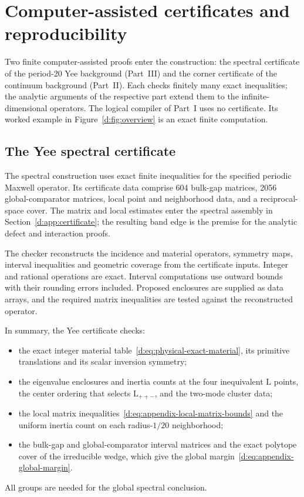 \section{Computer-assisted certificates and reproducibility}\label{d:sec:reproducibility}

Two finite computer-assisted proofs enter the construction: the
spectral certificate of the period-20 Yee background (Part~III) and the
corner certificate of the continuum background (Part~II). Each checks
finitely many exact inequalities; the analytic arguments of the
respective part extend them to the infinite-dimensional operators. The
logical compiler of Part~I uses no certificate. Its worked example in
Figure~\ref{d:fig:overview} is an exact finite computation.

\subsection{The Yee spectral certificate}\label{si:sec:yee-certificate}

The spectral construction uses exact finite inequalities for the specified
periodic Maxwell operator. Its certificate data comprise 604 bulk-gap
matrices, 2056 global-comparator matrices, local point and neighborhood
data, and a reciprocal-space cover. The matrix and local estimates enter
the spectral assembly in Section~\ref{d:app:certificate}; the resulting
band edge is the premise for the analytic defect and interaction proofs.

The checker reconstructs the incidence and material operators, symmetry
maps, interval inequalities and geometric coverage from the certificate
inputs. Integer and rational operations are exact. Interval computations
use outward bounds with their rounding errors included. Proposed
enclosures are supplied as data arrays, and the required matrix
inequalities are tested against the reconstructed operator.

In summary, the Yee certificate checks:
\begin{itemize}
\item the exact integer material table~\eqref{d:eq:physical-exact-material},
its primitive translations and its scalar inversion symmetry;
\item the eigenvalue enclosures and inertia counts at the four
inequivalent $\mathrm{L}$ points, the center ordering that selects $\mathrm{L}_{++-}$,
and the two-mode cluster data;
\item the local matrix inequalities~\eqref{d:eq:appendix-local-matrix-bounds}
and the uniform inertia count on each radius-$1/20$ neighborhood;
\item the bulk-gap and global-comparator interval matrices and the exact
polytope cover of the irreducible wedge, which give the global
margin~\eqref{d:eq:appendix-global-margin}.
\end{itemize}
All groups are needed for the global spectral conclusion.

